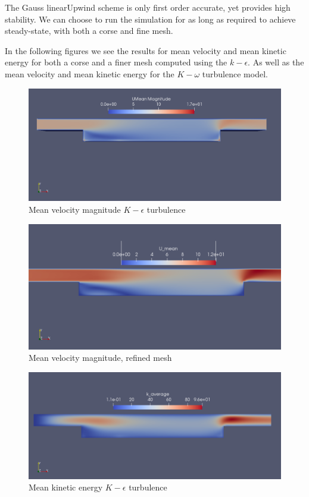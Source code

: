 \documentclass[paper=a4, fontsize=11pt]{article} %
\numberwithin{equation}{section} %
\numberwithin{figure}{section} %
\numberwithin{table}{section} %
\begin{document}
    The Gauss linearUpwind scheme is only first order accurate, yet provides high stability. We can choose to run the simulation for as long as required to achieve steady-state, with both a corse and fine mesh. 

    In the following figures we see the results for mean velocity and mean kinetic energy for both a corse and a finer mesh computed using the $k-\epsilon$. As well as the mean velocity and mean kinetic energy for the $K-\omega$ turbulence model.

    \begin{figure}[h]
        \centering
        \includegraphics[width=0.6\linewidth]{Figures/simple_U_mean}
        \caption{Mean velocity magnitude $K - \epsilon$ turbulence}
        \label{fig:MeanUSimple}
    \end{figure}

    \begin{figure}[H]
        \centering
        \includegraphics[width=0.6\linewidth]{Figures/simple_refined_U_mean}
        \caption{Mean velocity magnitude, refined mesh}
        \label{fig:MeanUSimpleRef}
    \end{figure}

    \begin{figure}[h]
        \centering
        \includegraphics[width=0.6\linewidth]{Figures/simple_K_mean}
        \caption{Mean kinetic energy $K - \epsilon$ turbulence}
        \label{fig:MeanKSimple}
    \end{figure}
\end{document}
